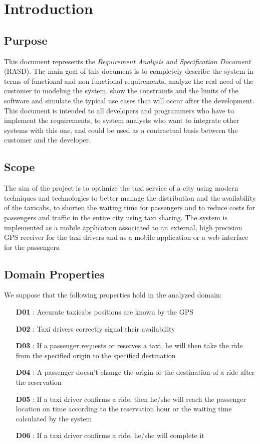 \chapter{Introduction} \label{chap1}

\section{Purpose}
This document represents the \textit{Requirement Analysis and Specification Document} (RASD). The main goal of this document is to completely describe the system in terms of functional and non functional requirements, analyze the real need of the customer to modeling the system, show the constraints and the limits of the software and simulate the typical use cases that will occur after the development. This document is intended to all developers and programmers who have to implement the requirements, to system analysts who want to integrate other systems with this one, and could be used as a contractual basis between the customer and the developer.

\section{Scope}
The aim of the project is to optimize the taxi service of a city using modern techniques and technologies to better manage the distribution and the availability of the taxicabs, to shorten the waiting time for passengers and to reduce costs for passengers and traffic in the entire city using taxi sharing. 
The system is implemented as a mobile application associated to an external, high precision GPS receiver for the taxi drivers and as a mobile application or a web interface for the passengers.

\section{Domain Properties}
\noindent We suppose that the following properties hold in the analyzed domain:
\begin{itemize}
	\item [\textbf{D01}] : Accurate taxicabs positions are known by the GPS
	\item [\textbf{D02}] : Taxi drivers correctly signal their availability
	\item [\textbf{D03}] : If a passenger requests or reserves a taxi, he will then take the ride from the specified origin to the specified destination
	\item [\textbf{D04}] : A passenger doesn't change the origin or the destination of a ride after the reservation
	\item [\textbf{D05}] : If a taxi driver confirms a ride, then he/she will reach the passenger location on time according to the reservation hour or the waiting time calculated by the system
	\item [\textbf{D06}] : If a taxi driver confirms a ride, he/she will complete it
\end{itemize}

